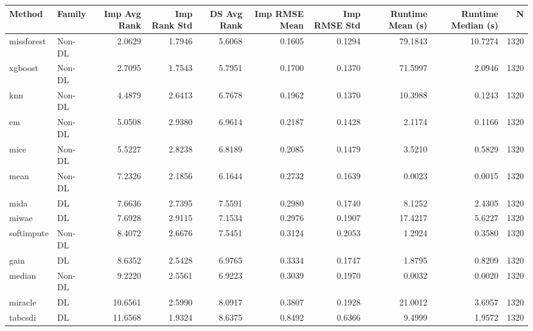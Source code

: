 \begin{tabular}{llrrrrrrrr}
\toprule
Method & Family & Imp Avg Rank & Imp Rank Std & DS Avg Rank & Imp RMSE Mean & Imp RMSE Std & Runtime Mean (s) & Runtime Median (s) & N \\
\midrule
missforest & Non-DL & 2.0629 & 1.7946 & 5.6068 & 0.1605 & 0.1294 & 79.1843 & 10.7274 & 1320 \\
xgboost & Non-DL & 2.7095 & 1.7543 & 5.7951 & 0.1700 & 0.1370 & 71.5997 & 2.0946 & 1320 \\
knn & Non-DL & 4.4879 & 2.6413 & 6.7678 & 0.1962 & 0.1370 & 10.3988 & 0.1243 & 1320 \\
em & Non-DL & 5.0508 & 2.9380 & 6.9614 & 0.2187 & 0.1428 & 2.1174 & 0.1166 & 1320 \\
mice & Non-DL & 5.5227 & 2.8238 & 6.8189 & 0.2085 & 0.1479 & 3.5210 & 0.5829 & 1320 \\
mean & Non-DL & 7.2326 & 2.1856 & 6.1644 & 0.2732 & 0.1639 & 0.0023 & 0.0015 & 1320 \\
mida & DL & 7.6636 & 2.7395 & 7.5591 & 0.2980 & 0.1740 & 8.1252 & 2.4305 & 1320 \\
miwae & DL & 7.6928 & 2.9115 & 7.1534 & 0.2976 & 0.1907 & 17.4217 & 5.6227 & 1320 \\
softimpute & Non-DL & 8.4072 & 2.6676 & 7.5451 & 0.3124 & 0.2053 & 1.2924 & 0.3580 & 1320 \\
gain & DL & 8.6352 & 2.5428 & 6.9765 & 0.3334 & 0.1747 & 1.8795 & 0.8209 & 1320 \\
median & Non-DL & 9.2220 & 2.5561 & 6.9223 & 0.3039 & 0.1970 & 0.0032 & 0.0020 & 1320 \\
miracle & DL & 10.6561 & 2.5990 & 8.0917 & 0.3807 & 0.1928 & 21.0012 & 3.6957 & 1320 \\
tabcsdi & DL & 11.6568 & 1.9324 & 8.6375 & 0.8492 & 0.6366 & 9.4999 & 1.9572 & 1320 \\
\bottomrule
\end{tabular}
